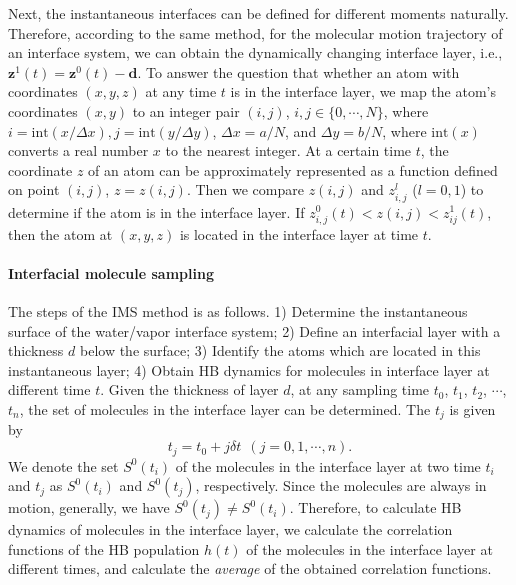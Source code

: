 Next, the instantaneous interfaces can be defined for different moments naturally. 
Therefore, according to the same method, for the molecular motion trajectory of an interface system, 
we can obtain the dynamically changing interface layer, i.e., ${\mathbf z}^1(t)={\mathbf z}^0(t)-{\mathbf d}$. 
To answer the question that whether an atom with coordinates $(x, y, z)$ at any time $t$ is in the interface layer,
we map the atom's coordinates $(x, y)$ to an integer pair $(i, j)$, $i,j \in  \{0,\cdots,N\}$, 
where $i = \text{int}(x /\Delta x), j = \text{int}(y/\Delta y)$, $\Delta x = a/N$, and $\Delta y = b/N$, 
where $\text{int}(x)$ converts a real number $x$ to the nearest integer.
At a certain time $t$, the coordinate $z$ of an atom can be approximately represented as a function defined on point $(i, j)$, $z=z(i,j)$. 
Then we compare $z(i,j)$ and $z^l_{i,j}$ ($l=0,1$) to determine if the atom is in the interface layer. 
If $z^0_{i,j}(t)<z(i,j)<z^1_{ij}(t)$, then the atom at $(x,y,z)$ is located in the interface layer at time $t$.

\paragraph{Interfacial molecule sampling}\label{para_MS_interface}
The steps of the IMS method is as follows. 
1) Determine the instantaneous surface of the water/vapor interface system;
2) Define an interfacial layer with a thickness $d$ below the surface; 
3) Identify the atoms which are located in this instantaneous layer;
4) Obtain HB dynamics for molecules in interface layer at different time $t$.
Given the thickness of layer $d$, at any sampling time $t_0$, $t_1$, $t_2$, $\cdots$, $t_n$, the set of molecules in the interface layer can be determined.
The $t_j$ is given by 
\begin{equation}
t_j = t_0 + j{\delta} t \ \ (j=0,1,\cdots,n).
\end{equation}
We denote the set $S^0(t_i)$ of the molecules in the interface layer at two time $t_i$  and $t_j$ as $S^0(t_i)$ and $S^0(t_j)$, respectively.
Since the molecules are always in motion, generally, we have $S^0(t_j) \neq S^0(t_i)$. 
Therefore, to calculate HB dynamics of molecules in the interface layer, we calculate the correlation functions of 
the HB population $h(t)$ of the molecules in the interface layer at different times, 
and calculate the \emph{average} of the obtained correlation functions. 
 
